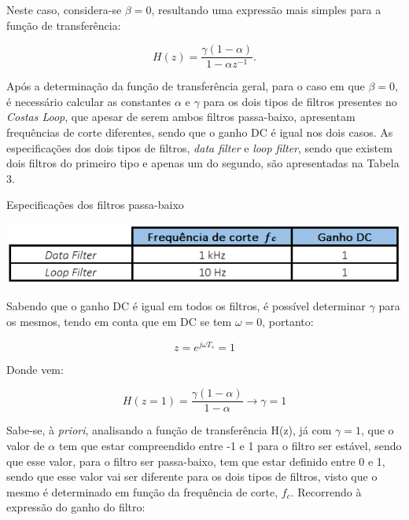 \documentclass[11pt]{article}
\numberwithin{equation}{section}
\begin{document}
\vspace{1mm}
Neste caso, considera-se $\beta=0$, resultando uma expressão mais simples para a função de transferência:
 
\vspace{-3mm}
\begin{equation}
H(z) = \frac{\gamma(1-\alpha)}{1-\alpha z^{-1}}.
\end{equation} 

\vspace{1mm}
Após a determinação da função de transferência geral, para o caso em que $\beta = 0$, é necessário calcular as constantes $\alpha$ e $\gamma$ para os dois tipos de filtros presentes no \textit{Costas Loop}, que apesar de serem ambos filtros passa-baixo, apresentam frequências de corte diferentes, sendo que o ganho DC é igual nos dois casos. As especificações dos dois tipos de filtros, \textit{data filter} e \textit{loop filter}, sendo que existem dois filtros do primeiro tipo e apenas um do segundo, são apresentadas na Tabela 3. 

\begin{table}[H]
 	\centering
 	\caption{Especificações dos filtros passa-baixo}
 	\vspace{-1.5mm}
 	\includegraphics[keepaspectratio=true, scale=0.70]{tabelas/especificacoes}
\end{table}

Sabendo que o ganho DC é igual em todos os filtros, é possível determinar $\gamma$ para os mesmos, tendo em conta que em DC se tem $\omega = 0$, portanto:

\vspace{-3mm}
\begin{equation}
	z = e^{j \omega T_s} = 1
\end{equation}

Donde vem:

\vspace{-3mm}
\begin{equation}
	H(z = 1) = \frac{\gamma(1-\alpha)}{1-\alpha} \longrightarrow \gamma = 1
\end{equation} 

Sabe-se, à \textit{priori}, analisando a função de transferência H(z), já com $\gamma = 1$, que o valor de $\alpha$ tem que estar compreendido entre -1 e 1 para o filtro ser estável, sendo que esse valor, para o filtro ser passa-baixo, tem que estar definido entre 0 e 1, sendo que esse valor vai ser diferente para os dois tipos de filtros, visto que o mesmo é determinado em função da frequência de corte, \textit{$f_c$}. Recorrendo à expressão do ganho do filtro:
\end{document}

